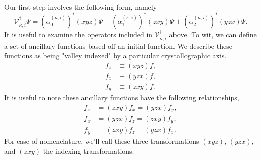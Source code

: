 Our first step involves the following form, namely
\begin{equation}
\mathcal{V}_{\kappa,i}^{\dagger}\Psi
  =
    \left(\alpha_{0}^{\left(\kappa,i\right)}\right)^{*}
    \left(xyz\right)
    \Psi
    +
    \left(\alpha_{1}^{\left(\kappa,i\right)}\right)^{*}
    \left(zxy\right)
    \Psi
    +
    \left(\alpha_{2}^{\left(\kappa,i\right)}\right)^{*}
    \left(yzx\right)
    \Psi.
\end{equation}
It is useful to examine the operators included in $ \mathcal{V} _{\kappa,i}
^{\dagger} $ above. To wit, we can define a set of ancillary functions based off
an initial function. We describe these functions as being "valley indexed" by a
particular crystallographic axis. 
\begin{align}
  f_{z} & \equiv \left(xyz\right)f, \label{idx:z}\\
  f_{x} & \equiv \left(yzx\right)f, \label{idx:x}\\
  f_{y} & \equiv \left(zxy\right)f. \label{idx:y}
\end{align}
It is useful to note these ancillary functions have the following relationships,
\begin{align}
  f_{z} & = \left(zxy\right)f_{x} = \left(yzx\right)f_{y}, \\
  f_{x} & = \left(yzx\right)f_{z} = \left(zxy\right)f_{y}, \\
  f_{y} & = \left(zxy\right)f_{z} = \left(yzx\right)f_{x}.
\end{align}
For ease of nomenclature, we'll call these three transformations
$\left(xyz\right)$, $\left(yzx\right)$, and $\left(zxy\right)$ the indexing
transformations.


